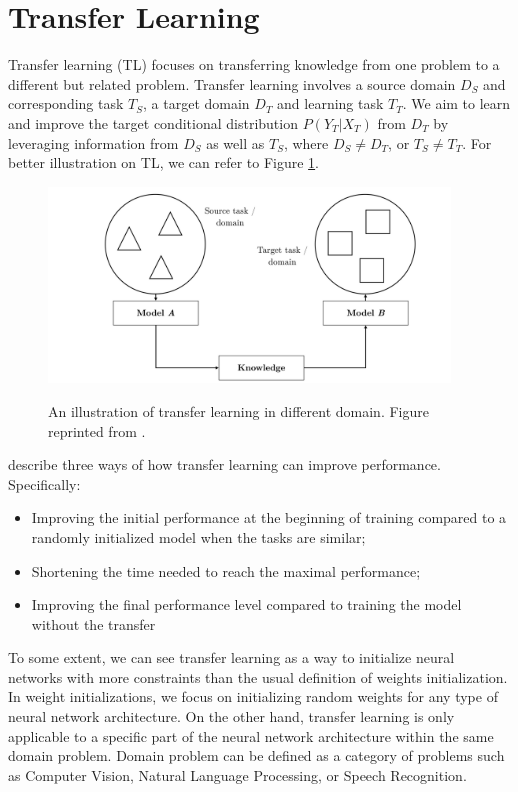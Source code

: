 \section{Transfer Learning}
\label{sec:bm_tl}
Transfer learning (TL) focuses on transferring knowledge from one problem to a different but related problem. Transfer learning involves a source domain $D_S$ and corresponding task $T_S$, a target domain $D_T$ and learning task $T_T$. We aim to learn and improve the target conditional distribution $P(Y_T|X_T)$ from $D_T$ by leveraging information from $D_S$ as well as $T_S$, where $D_S \neq D_T$, or $T_S \neq T_T$. For better illustration on TL, we can refer to Figure \ref{img:transfer_learning}.

\begin{figure}[h]
    {\includegraphics[width=0.95\textwidth]{img/transfer_learning_scenario.png}}
    \centering
    \caption{An illustration of transfer learning in different domain. Figure reprinted from \cite{ruder2019transfer}.}
    \label{img:transfer_learning}
\end{figure}

\cite{shavlik2010transfer} describe three ways of how transfer learning can
improve performance. Specifically:
\begin{itemize}
    \item Improving the initial performance at the beginning of training compared
          to a randomly initialized model when the tasks are similar;
    \item Shortening the time needed to reach the maximal performance;
    \item Improving the final performance level compared to training the model
          without the transfer
\end{itemize}

To some extent, we can see transfer learning as a way to initialize neural networks with more constraints than the usual definition of weights initialization. In weight initializations, we focus on initializing random weights for any type of neural network architecture. On the other hand, transfer learning is only applicable to a specific part of the neural network architecture within the same domain problem. Domain problem can be defined as a category of problems such as Computer Vision, Natural Language Processing, or Speech Recognition.

